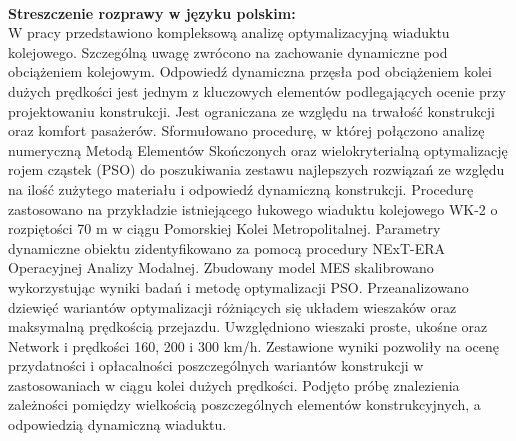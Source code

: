 \begin{myfont}
	\pagebreak[4]
	
	\thispagestyle{plain}
	\noindent
	\\
	\textbf{Streszczenie rozprawy w języku polskim:}\\
	W pracy przedstawiono kompleksową analizę optymalizacyjną wiaduktu kolejowego. Szczególną uwagę zwrócono na zachowanie dynamiczne pod obciążeniem kolejowym. Odpowiedź dynamiczna przęsła pod obciążeniem kolei dużych prędkości jest jednym z kluczowych elementów podlegających ocenie przy projektowaniu konstrukcji. Jest ograniczana ze względu na trwałość konstrukcji oraz komfort pasażerów. Sformułowano procedurę, w której połączono analizę numeryczną Metodą Elementów Skończonych oraz wielokryterialną optymalizację rojem cząstek (PSO) do poszukiwania zestawu najlepszych rozwiązań ze względu na ilość zużytego materiału i odpowiedź dynamiczną konstrukcji. Procedurę zastosowano na przykładzie istniejącego łukowego wiaduktu kolejowego WK-2 o rozpiętości 70 m w ciągu Pomorskiej Kolei Metropolitalnej. Parametry dynamiczne obiektu zidentyfikowano za pomocą procedury NExT-ERA Operacyjnej Analizy Modalnej. Zbudowany model MES skalibrowano wykorzystując wyniki badań i metodę optymalizacji PSO. Przeanalizowano dziewięć wariantów optymalizacji różniących się układem wieszaków oraz maksymalną prędkością przejazdu. Uwzględniono wieszaki proste, ukośne oraz Network i prędkości 160, 200 i 300 km/h. Zestawione wyniki pozwoliły na ocenę przydatności i opłacalności poszczególnych wariantów konstrukcji w zastosowaniach w ciągu kolei dużych prędkości. Podjęto próbę znalezienia zależności pomiędzy wielkością poszczególnych elementów konstrukcyjnych, a odpowiedzią dynamiczną wiaduktu.
	

\end{myfont}
